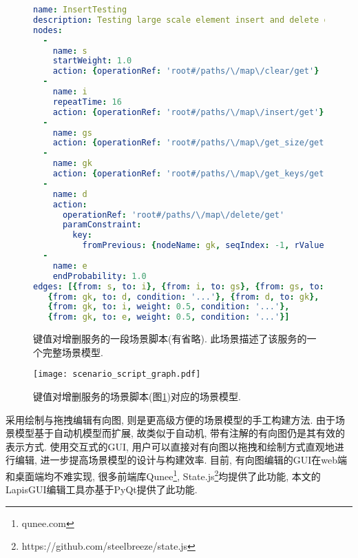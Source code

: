         \begin{figure}[!htb]
            \centering
            \scriptsize
            \tt
            
            \begin{lstlisting}[language=yaml]
name: InsertTesting
description: Testing large scale element insert and delete operations
nodes:
  -
    name: s
    startWeight: 1.0
    action: {operationRef: 'root#/paths/\/map\/clear/get'}
  -
    name: i
    repeatTime: 16
    action: {operationRef: 'root#/paths/\/map\/insert/get'}
  -
    name: gs
    action: {operationRef: 'root#/paths/\/map\/get_size/get'}
  -
    name: gk
    action: {operationRef: 'root#/paths/\/map\/get_keys/get'}
  -
    name: d
    action:
      operationRef: 'root#/paths/\/map\/delete/get'
      paramConstraint:
        key:
          fromPrevious: {nodeName: gk, seqIndex: -1, rValue: '$response.body#/keys/0'}
  -
    name: e
    endProbability: 1.0
edges: [{from: s, to: i}, {from: i, to: gs}, {from: gs, to: gk},
   {from: gk, to: d, condition: '...'}, {from: d, to: gk},
   {from: gk, to: i, weight: 0.5, condition: '...'},
   {from: gk, to: e, weight: 0.5, condition: '...'}]
            \end{lstlisting}
            
            \caption[键值对增删服务的一段场景脚本]{键值对增删服务的一段场景脚本(有省略). 此场景描述了该服务的一个完整场景模型.}
            \label{fig:scenario_script_eg}
        \end{figure}
        
        \begin{figure}[!htb]
            \centering
            \texttt{[image: scenario\_script\_graph.pdf]}
            \caption[键值对增删服务的场景脚本对应的场景模型]{键值对增删服务的场景脚本(图\ref{fig:scenario_script_eg})对应的场景模型.}
            \label{fig:scenario_script_graph}
        \end{figure}
        
        采用绘制与拖拽编辑有向图, 则是更高级方便的场景模型的手工构建方法. 由于场景模型基于自动机模型而扩展, 故类似于自动机, 带有注解的有向图仍是其有效的表示方式. 使用交互式的GUI, 用户可以直接对有向图以拖拽和绘制方式直观地进行编辑, 进一步提高场景模型的设计与构建效率. 目前, 有向图编辑的GUI在web端和桌面端均不难实现, 很多前端库Qunee\footnote{qunee.com}, State.js\footnote{https://github.com/steelbreeze/state.js}均提供了此功能, 本文的LapisGUI编辑工具亦基于PyQt提供了此功能.
        
